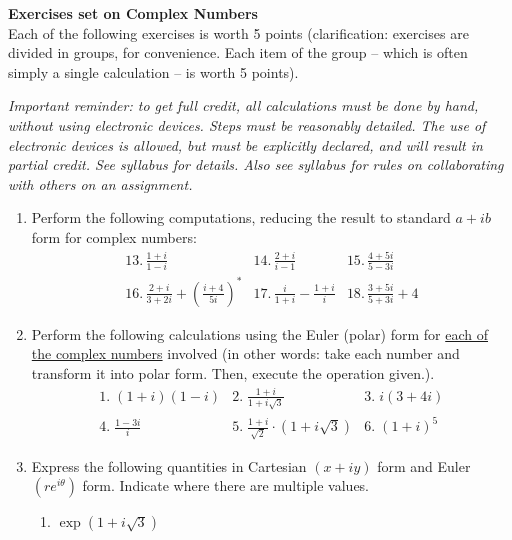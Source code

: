 \documentclass{article}
\begin{document}
{\bf Exercises set on Complex Numbers }\\

Each of the following exercises is worth 5 points (clarification: exercises are divided in groups, for convenience. Each item of the group -- which is often simply a single calculation --  is worth 5 points). 

\emph{Important reminder: to get full credit, all calculations must be done by hand, without using electronic devices. Steps must be reasonably detailed.  The use of electronic devices is allowed, but must be explicitly declared, and will result in partial credit. See syllabus for details. Also see syllabus for rules on collaborating with others on an assignment.   }  


\begin{enumerate}


\item  Perform  the following computations, reducing the result to
standard $a+ib$ form for complex numbers: 
\[
\begin{array}{lll}
13.\,\frac{\textstyle 1+i}{\textstyle 1-i} & 14.\,\frac{\textstyle 2+i}{\textstyle i-1} & 15.\,\frac{\textstyle 4+5i}{\textstyle 5-3i} \\ 
16.\,\frac{\textstyle 2+i}{\textstyle 3+2i}+\left( \frac{\textstyle i+4}{\textstyle 5i}\right)^{\ast} & 17.\,\frac{\textstyle i}{\textstyle 1+i}-\frac{\textstyle 1+i}{\textstyle i} & 18.\,\frac{\textstyle 3+5i}{\textstyle 5+3i}+4
\end{array}
\]


\item Perform the following calculations using the Euler (polar) form for \underline{each of the complex numbers} involved (in other words: take each number and transform it into polar form. Then, execute the operation given.).
\[
\begin{array}{lll}
1.\;\left( 1+i\right) \left( 1-i\right)  & 2.\;\frac{\textstyle 1+i}{\textstyle 1+i\sqrt{3}} & 3.\;i\left( 3+4i\right)  \\ 
4.\;\frac{\textstyle 1-3i}{\textstyle i} & 5.\;\frac{\textstyle 1+i}{\textstyle \sqrt{2}}\cdot \left( 1+i\sqrt{3}\right)  & 6.\;\left( 1+i\right) ^{5}
\end{array}
\]

\item Express the following quantities in Cartesian $\left(x+iy\right) $ form and Euler $\left( re^{i\theta}\right)$ form. Indicate where there are multiple values.

\begin{enumerate}
\item $\exp \left( 1+i\sqrt{3}\right)$


\end{enumerate}
\end{enumerate}
\end{document}

